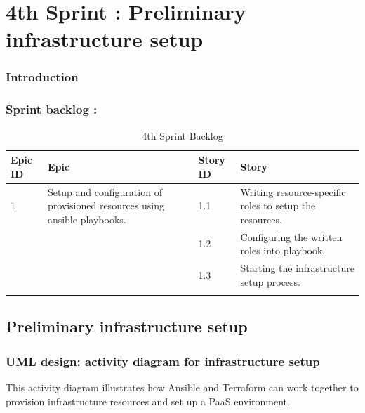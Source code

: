 \graphicspath{{./assets/}}
\setcounter{mtc}{6}
\chapter{4th Sprint : Preliminary infrastructure setup}

\minitoc
\newpage
\subsection*{Introduction}

\subsection{Sprint backlog :}

\begin{longtable}[H]{|m{1.5cm}|m{3cm}|m{1.5cm}|m{9cm}|}
\hline
{\textbf{Epic ID}} & {\textbf{Epic}} & {\textbf{Story ID}} & {\textbf{Story}}\\
\hline
1  & Setup and configuration of provisioned resources using ansible playbooks.	 &  1.1	 &  Writing resource-specific roles to setup the resources. \\
\cline{3-4}
& & 1.2 & Configuring the written roles into playbook. \\
\cline{3-4}
& & 1.3	& Starting the infrastructure setup process. \\
\cline{3-4}
\hline
\caption{4th Sprint Backlog}
\end{longtable}
\section{Preliminary infrastructure setup}
\subsection{UML design: activity diagram for infrastructure setup}

This activity diagram illustrates how Ansible and Terraform can work together to provision infrastructure resources and set up a PaaS environment.

